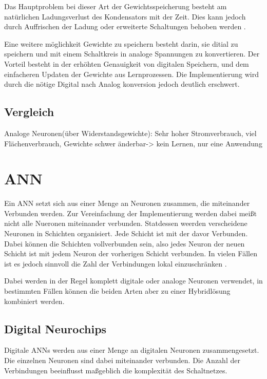 \documentclass[conference]{IEEEtran}
\begin{document}
    Das Hauptproblem bei dieser Art der Gewichtsspeicherung besteht am natürlichen Ladungsverlust des Kondensators mit der Zeit.
    Dies kann jedoch durch Auffrischen der Ladung oder erweiterte Schaltungen behoben werden \cite{reed1989multiple} .


    Eine weitere möglichkeit Gewichte zu speichern besteht darin, sie ditial zu speichern und mit einem Schaltkreis in analoge Spannungen zu konvertieren.
    Der Vorteil besteht in der erhöhten Genauigkeit von digitalen Speichern, und dem einfacheren Updaten der Gewichte aus Lernprozessen.
    Die Implementierung wird durch die nötige Digital nach Analog konversion jedoch deutlich erschwert.



    \subsection{Vergleich}

    Analoge Neuronen(über Widerstandsgewichte): Sehr hoher Stromverbrauch, viel Flächenverbrauch, Gewichte schwer änderbar-> kein Lernen, nur eine Anwendung

    \section{ANN}


    Ein ANN setzt sich aus einer Menge an Neuronen zusammen, die miteinander Verbunden werden.
    Zur Vereinfachung der Implementierung werden dabei meißt nicht alle Nueronen miteinander verbunden.
    Statdessen weerden verscheidene Neuronen in Schichten organisiert.
    Jede Schicht ist mit der davor Verbunden.
    Dabei können die Schichten vollverbunden sein, also jedes Neuron der neuen Schicht ist mit jedem Neuron der vorherigen Schicht verbunden.
    In vielen Fällen ist es jedoch sinnvoll die Zahl der Verbindungen lokal einzuschränken \cite{boser1991analog} .

    Dabei werden in der Regel komplett digitale oder analoge Neuronen verwendet, in bestimmten Fällen können die beiden Arten aber zu einer Hybridlösung kombiniert werden.


    \subsection{Digital Neurochips}

    Digitale ANNs werden aus einer Menge an digitalen Neuronen zusammengesetzt.
    Die einzelnen Neuronen sind dabei miteinander verbunden.
    Die Anzahl der Verbindungen beeinflusst maßgeblich die komplexität des Schaltnetzes.
\end{document}
